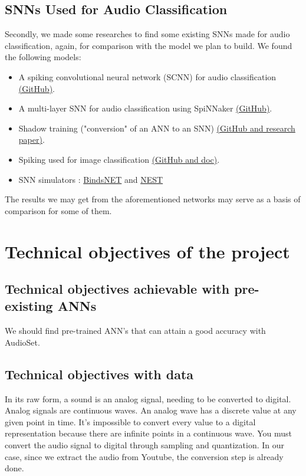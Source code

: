 \documentclass[11pt]{article}
\begin{document}
\subsection{SNNs Used for Audio Classification}

Secondly, we made some researches to find some existing SNNs made for audio classification, again, for comparison with the model we plan to build.
We found the following models:
\begin{itemize}
  \item A spiking convolutional neural network (SCNN) for audio classification \hyperref[item:SCNN-audio-classification]{(GitHub)}.
  \item A multi-layer SNN for audio classification using SpiNNaker \hyperref[item:spinnaker-audio-classification]{(GitHub)}.
  \item Shadow training ("conversion" of an ANN to an SNN) \hyperref[item:shadow-training]{(GitHub and research paper)}.
  \item Spiking used for image classification \hyperref[item:stereospike]{(GitHub and doc)}.
  \item SNN simulators : \href{item:bindsNET_snntorch-lib}{BindsNET} and \href{item:nest_snntorch-lib}{NEST}
\end{itemize}

The results we may get from the aforementioned networks may serve as a basis of comparison for some of them.


\section{Technical objectives of the project}
\subsection{Technical objectives achievable with pre-existing ANNs}

We should find pre-trained ANN's that can attain a good accuracy with AudioSet.

\subsection{Technical objectives with data}

In its raw form, a sound is an analog signal, needing to be converted to digital. Analog signals are continuous waves. An analog wave has a discrete value at any given point in time. It’s impossible to convert every value to a digital representation because there are infinite points in a continuous wave. You must convert the audio signal to digital through sampling and quantization. In our case, since we extract the audio from Youtube, the conversion step is already done.
\end{document}
